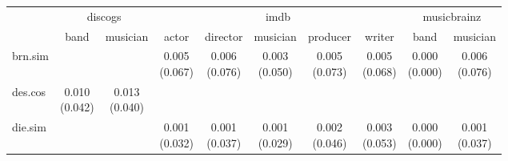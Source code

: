\documentclass[epsfig,a4paper,11pt,titlepage,twoside,openany]{book}
\begin{document}



\begin{table}[H]
\centering
\begin{tabular}{l|c|c|c|c|c|c|c|c|c|}
\cline{2-10}
                                                           & \multicolumn{2}{c|}{discogs} & \multicolumn{5}{c|}{imdb}                                                & \multicolumn{2}{c|}{musicbrainz} \\ \cline{2-10} 
                                                           & band          & musician     & actor        & director     & musician     & producer     & writer       & band            & musician       \\ \hline
\multicolumn{1}{|l|}{brn.sim}                        &               &              & \makecell{0.005 \\ (0.067)} & \makecell{0.006 \\ (0.076)} & \makecell{0.003 \\ (0.050)} & \makecell{0.005 \\ (0.073)} & \makecell{0.005 \\ (0.068)} & \makecell{0.000 \\ (0.000)}    & \makecell{0.006 \\ (0.076)}   \\ \hline
\multicolumn{1}{|l|}{des.cos}                  & \makecell{0.010 \\ (0.042)}  & \makecell{0.013 \\ (0.040)} &              &              &              &              &              &                 &                \\ \hline
\multicolumn{1}{|l|}{die.sim}                        &               &              & \makecell{0.001 \\ (0.032)} & \makecell{0.001 \\ (0.037)} & \makecell{0.001 \\ (0.029)} & \makecell{0.002 \\ (0.046)} & \makecell{0.003 \\ (0.053)} & \makecell{0.000 \\ (0.000)}    & \makecell{0.001 \\ (0.037)}   \\ \hline

\end{tabular}
\end{table}
\end{document}
